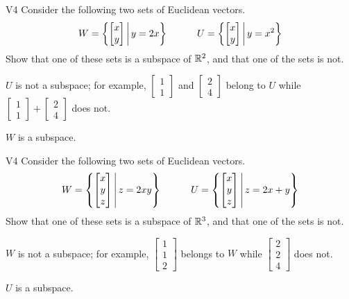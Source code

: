 \begin{problem}{V4}
Consider the following two sets of Euclidean vectors.
\[
  W = \left\{\begin{bmatrix} x \\ y \end{bmatrix}\,\middle|\,y=2x\right\}
\hspace{3em}
  U = \left\{\begin{bmatrix} x \\ y \end{bmatrix}\,\middle|\,y=x^2\right\}
\]
Show that one of these sets is a subspace of \(\mathbb{R}^2\), and
that one of the sets is not.
\end{problem}
\begin{solution}
\(U\) is not a subspace; for example, \(\begin{bmatrix} 1 \\ 1 \end{bmatrix}\)
and \(\begin{bmatrix} 2 \\ 4 \end{bmatrix}\) belong to \(U\) while
\(\begin{bmatrix} 1 \\ 1 \end{bmatrix}+\begin{bmatrix} 2 \\ 4 \end{bmatrix}\)
does not.

\(W\) is a subspace.
\end{solution}


\begin{problem}{V4}
Consider the following two sets of Euclidean vectors.
\[
  W = \left\{\begin{bmatrix} x \\ y \\ z \end{bmatrix}\,\middle|\,z=2xy\right\}
\hspace{3em}
  U = \left\{\begin{bmatrix} x \\ y \\ z \end{bmatrix}\,\middle|\,z=2x+y\right\}
\]
Show that one of these sets is a subspace of \(\mathbb{R}^3\), and
that one of the sets is not.
\end{problem}
\begin{solution}
\(W\) is not a subspace; for example,
\(\begin{bmatrix} 1 \\ 1 \\ 2 \end{bmatrix}\) belongs to \(W\) while
\(\begin{bmatrix} 2 \\ 2 \\ 4 \end{bmatrix}\)
does not.

\(U\) is a subspace.
\end{solution}
